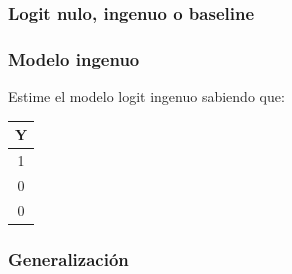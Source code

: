 %
%    
%    
%    

\subsubsection{Logit nulo, ingenuo o baseline}

\begin{frame}[fragile]
	\frametitle{Modelo ingenuo}
	
	Estime el modelo logit ingenuo sabiendo que:
	\bigskip
	
	\begin{tabular}{c}
		\hline
		Y \\
		\hline
		1 \\
		0 \\
		0 \\
		\hline
	\end{tabular}
\end{frame}

\subsubsection{Generalización}

